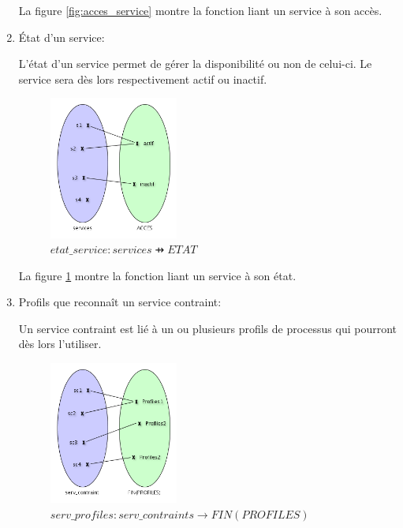 \documentclass[french, titlepage, 10pt, a4paper]{article}
\begin{document}
\begin{enumerate}
    La figure \ref{fig:acces_service} montre la fonction liant un service à son
    accès.

  \item État d'un service:

    L'état d'un service permet de gérer la disponibilité ou non de celui-ci.
    Le service sera dès lors respectivement actif ou inactif.

    \begin{figure}[htb]
      \centering
      \includegraphics[width=0.4\textwidth]{etat_service.png}
      \caption{$etat\_service: services \pfun ETAT$}
      \label{fig:etat_service}
    \end{figure}

    La figure \ref{fig:etat_service} montre la fonction liant un service à son
    état.

  \item Profils que reconnaît un service contraint:

    Un service contraint est lié à un ou plusieurs profils de processus qui
    pourront dès lors l'utiliser.

    \begin{figure}[htb]
      \centering
      \includegraphics[width=0.4\textwidth]{serv_profiles.png}
      \caption{$serv\_profiles: serv\_contraints \rightarrow FIN(PROFILES)$}
      \label{fig:serv_profiles}
    \end{figure}


\end{enumerate}
\end{document}
